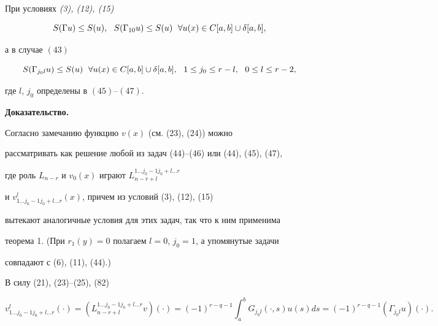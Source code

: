 \begin{lem}


При условиях {\em (3), (12), (15)}


\begin{equation}


S(\Gamma u)\le S(u),\ \ S(\Gamma_{10} u)\le S(u)


\ \; \forall u(x)\in C\ab\cup\delta\ab,


\end{equation}


а в случае $(43)$


\begin{equation}


S(\Gamma_{j_0l}u)\le S(u)\ \; \forall u(x)\in C\ab\cup\delta\ab,


\ \ 1\le j_0\le r-l,\ \ 0\le l\le r-2,


\end{equation}


где $l$, $j_0$ определены в $(45)$--$(47)$.


\end{lem}








{\bf Доказательство.}


Согласно замечанию функцию $v(x)$ (см. (23), (24)) можно


рассматривать как решение любой из задач (44)--(46) или (44), (45), (47),


где роль $L_{n-r}$ и $v_0(x)$ играют $L^{1\dotsc j_0-1j_0+l\dotsc r}_{n-r+l}$


и $v^l_{1\dotsc j_0-1j_0+l\dotsc r}(x)$, причем из условий (3), (12), (15)


вытекают аналогичные условия для этих задач, так что к ним применима


теорема 1. (При $r_1(y)=0$ полагаем $l=0$, $j_0=1$, а упомянутые задачи


совпадают с (6), (11), (44).)


 


В силу (21), (23)--(25), (82)


\begin{equation}


v^l_{1\dotsc j_0-1j_0+l\dotsc r}(\cdot)=(L^{1\dotsc j_0-1j_0+l\dotsc


r}_{n-r+l}v)(\cdot)=(-1)^{r-q-1}\int^b_a G_{j_0l}(\cdot,s)u(s)ds=


%


(-1)^{r-q-1}(\Gamma_{j_0l}u)(\cdot).


\end{equation}


